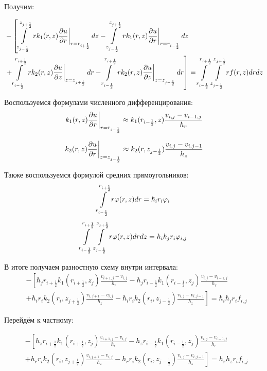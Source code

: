 Получим:

\begin{align*}
  &- \left [
   \mLimZ{z}{+\frac{1}{2}}{-\frac{1}{2}}{j}  \left . r k_1(r, z) \pdv{u}{r} \right \vert_{r = r_{i + \frac{1}{2}}} dz
  - \mLimZ{z}{+\frac{1}{2}}{-\frac{1}{2}}{j} \left . r k_1(r, z) \pdv{u}{r} \right \vert_{r = r_{i - \frac{1}{2}}} dz
  \right . \\
  &\left . + \mLimS{r}{+\frac{1}{2}}{-\frac{1}{2}} \left . rk_2(r, z)\pdv{u}{z} \right \vert_{z = z_{j + \frac{1}{2}}} dr
  - \mLimS{r}{+\frac{1}{2}}{-\frac{1}{2}} \left . rk_2(r, z)\pdv{u}{z} \right \vert_{z = z_{j - \frac{1}{2}}} dr
  \right ] = \mLim{+\frac{1}{2}}{-\frac{1}{2}}{+\frac{1}{2}}{-\frac{1}{2}} rf(r, z) dr dz
\end{align*}

Воспользуемся формулами численного дифференцирования:
\[
  \left . k_1(r, z) \pdv{u}{r} \right \vert_{r = r_{i - \frac{1}{2}}}
  \approx k_1(r_{i - \frac{1}{2}}, z) 
  \frac{v_{i, j} - v_{i - 1, j}}{h_r}
\]

\[
  \left . k_2(r, z) \pdv{u}{r} \right \vert_{z = z_{j - \frac{1}{2}}}
  \approx k_2(r, z_{j - \frac{1}{2}}) 
  \frac{v_{i, j} - v_{i, j - 1}}{h_z}
\]

Также воспользуемся формулой средних прямоугольников:
\[
  \mLimS{r}{+\frac{1}{2}}{-\frac{1}{2}} r \varphi(r, z) dr
  = \hbar_i r_i \varphi_i
\]
\[
  \mLim{+\frac{1}{2}}{-\frac{1}{2}}{+\frac{1}{2}}{-\frac{1}{2}} r \varphi(r, z) drdz
  = \hbar_i\hbar_j r_i \varphi_{i, j}
\]

В итоге получаем разностную схему внутри интервала:
\begin{align*}
  &- \left [ 
  \hbar_j r_{i+\frac{1}{2}} k_1(r_{i+\frac{1}{2}}, z_j) \frac{v_{i+1, j} - v_{i, j}}{h_{r}}
  - \hbar_j r_{i-\frac{1}{2}} k_1(r_{i-\frac{1}{2}}, z_j) \frac{v_{i, j} - v_{i - 1, j}}{h_{r}}
  \right . \\
  &\left .
  + \hbar_i r_{i} k_2(r_i, z_{j+\frac{1}{2}}) \frac{v_{i, j + 1} - v_{i, j}}{h_{z}}
  - \hbar_i r_{i} k_2(r_i, z_{j-\frac{1}{2}}) \frac{v_{i, j} - v_{i, j - 1}}{h_z}
  \right ]  = \hbar_i \hbar_j r_i f_{i, j}
\end{align*}

Перейдём к частному:

\begin{align*}
  &- \left [ 
  h_z r_{i+\frac{1}{2}} k_1(r_{i+\frac{1}{2}}, z_j) \frac{v_{i+1, j} - v_{i, j}}{h_{r}}
  - h_z r_{i-\frac{1}{2}} k_1(r_{i-\frac{1}{2}}, z_j) \frac{v_{i, j} - v_{i - 1, j}}{h_{r}}
  \right . \\
  &\left .
  + h_r r_{i} k_2(r_i, z_{j+\frac{1}{2}}) \frac{v_{i, j + 1} - v_{i, j}}{h_{z}}
  - h_r r_{i} k_2(r_i, z_{j-\frac{1}{2}}) \frac{v_{i, j} - v_{i, j - 1}}{h_z}
  \right ]  = h_r h_z r_i f_{i, j}
\end{align*}

